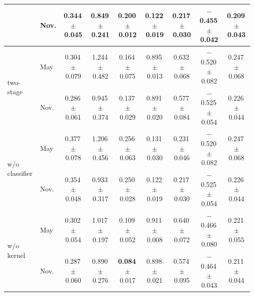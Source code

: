 \begin{table}[t]
\begin{tabular}{llccccccc}
 & Nov. & 0.344\,{\scriptsize$\pm$0.045} & \textbf{0.849}\,{\scriptsize$\pm$0.241} & 0.200\,{\scriptsize$\pm$0.012} & 0.122\,{\scriptsize$\pm$0.019} & 0.217\,{\scriptsize$\pm$0.030} & \textbf{$-$0.455}\,{\scriptsize$\pm$0.042} & \textbf{0.209}\,{\scriptsize$\pm$0.043} \\
\midrule
\multirow{2}{*}{two-stage} & May & 0.304\,{\scriptsize$\pm$0.079} & 1.244\,{\scriptsize$\pm$0.482} & 0.164\,{\scriptsize$\pm$0.075} & 0.895\,{\scriptsize$\pm$0.013} & 0.632\,{\scriptsize$\pm$0.068} & $-$0.520\,{\scriptsize$\pm$0.082} & 0.247\,{\scriptsize$\pm$0.068} \\
 & Nov. & 0.286\,{\scriptsize$\pm$0.061} & 0.945\,{\scriptsize$\pm$0.374} & 0.137\,{\scriptsize$\pm$0.029} & 0.891\,{\scriptsize$\pm$0.020} & 0.577\,{\scriptsize$\pm$0.084} & $-$0.525\,{\scriptsize$\pm$0.054} & 0.226\,{\scriptsize$\pm$0.044} \\
\midrule
\multirow{2}{*}{w/o classifier} & May & 0.377\,{\scriptsize$\pm$0.078} & 1.206\,{\scriptsize$\pm$0.456} & 0.256\,{\scriptsize$\pm$0.063} & 0.131\,{\scriptsize$\pm$0.030} & 0.231\,{\scriptsize$\pm$0.046} & $-$0.520\,{\scriptsize$\pm$0.082} & 0.247\,{\scriptsize$\pm$0.068} \\
 & Nov. & 0.354\,{\scriptsize$\pm$0.048} & 0.933\,{\scriptsize$\pm$0.317} & 0.250\,{\scriptsize$\pm$0.028} & 0.122\,{\scriptsize$\pm$0.019} & 0.217\,{\scriptsize$\pm$0.030} & $-$0.525\,{\scriptsize$\pm$0.054} & 0.226\,{\scriptsize$\pm$0.044} \\
\midrule
\multirow{2}{*}{w/o kernel} & May & 0.302\,{\scriptsize$\pm$0.054} & 1.017\,{\scriptsize$\pm$0.197} & 0.109\,{\scriptsize$\pm$0.052} & 0.911\,{\scriptsize$\pm$0.008} & 0.640\,{\scriptsize$\pm$0.072} & $-$0.466\,{\scriptsize$\pm$0.080} & 0.221\,{\scriptsize$\pm$0.055} \\
 & Nov. & 0.287\,{\scriptsize$\pm$0.060} & 0.890\,{\scriptsize$\pm$0.276} & \textbf{0.084}\,{\scriptsize$\pm$0.017} & 0.898\,{\scriptsize$\pm$0.021} & 0.574\,{\scriptsize$\pm$0.095} & $-$0.464\,{\scriptsize$\pm$0.043} & 0.211\,{\scriptsize$\pm$0.044} \\
\bottomrule
\end{tabular}

\end{table}
